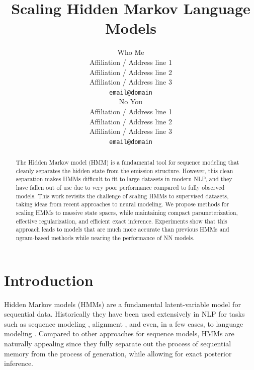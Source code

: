 \documentclass[11pt,a4paper]{article}
\title{Scaling Hidden Markov Language Models}
\author{Who Me \\
  Affiliation / Address line 1 \\
  Affiliation / Address line 2 \\
  Affiliation / Address line 3 \\
  \texttt{email@domain} \\\And
  No You \\
  Affiliation / Address line 1 \\
  Affiliation / Address line 2 \\
  Affiliation / Address line 3 \\
  \texttt{email@domain} \\}
\date{}
\begin{document}
\maketitle
\begin{abstract}
The Hidden Markov model (HMM) is a fundamental tool for sequence modeling that 
cleanly separates the hidden state from the emission structure.
However, this clean separation makes HMMs difficult to fit to large datasets in modern NLP, 
and they have fallen out of use due to very poor performance 
compared to fully observed models. This work revisits the challenge of 
scaling HMMs to supervised datasets, taking ideas from recent approaches to neural modeling.
We propose methods for scaling HMMs to massive state spaces, while maintaining compact parameterization, effective regularization, and efficient exact inference. Experiments show that this approach leads to models that are much more accurate than previous HMMs and ngram-based methods while nearing the performance of  NN models. 
\end{abstract}

\section{Introduction}


Hidden Markov models (HMMs) are a fundamental latent-variable model for sequential data.
Historically they have been used extensively in NLP for tasks such as
sequence modeling \citep{rabiner1990tut}, alignment \citep{vogel1996hmm},
and even, in a few cases, to language modeling \citep{kuhn1994hmmlm,huang2011thesis}. 
Compared to other approaches for sequence models, HMMs are naturally appealing since they 
fully separate out the process of sequential memory from the process of generation, while allowing for 
exact posterior inference. 


\end{document}
